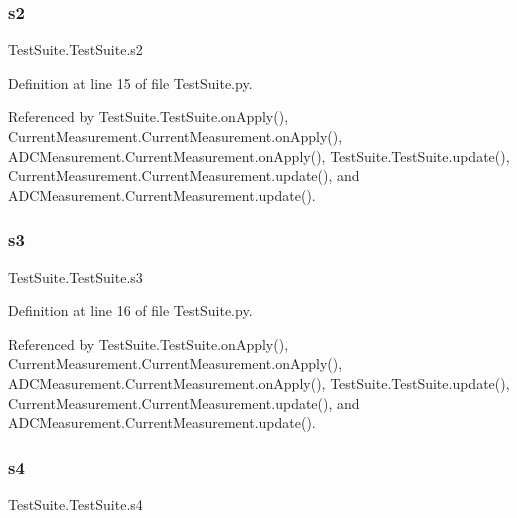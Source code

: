 \subsubsection{\texorpdfstring{s2}{s2}}
{\footnotesize\ttfamily Test\+Suite.\+Test\+Suite.\+s2}



Definition at line 15 of file Test\+Suite.\+py.



Referenced by Test\+Suite.\+Test\+Suite.\+on\+Apply(), Current\+Measurement.\+Current\+Measurement.\+on\+Apply(), A\+D\+C\+Measurement.\+Current\+Measurement.\+on\+Apply(), Test\+Suite.\+Test\+Suite.\+update(), Current\+Measurement.\+Current\+Measurement.\+update(), and A\+D\+C\+Measurement.\+Current\+Measurement.\+update().

\mbox{\label{classTestSuite_1_1TestSuite_a9995e2f1a3b89fdf26e782b9aefae2cc}} 
\subsubsection{\texorpdfstring{s3}{s3}}
{\footnotesize\ttfamily Test\+Suite.\+Test\+Suite.\+s3}



Definition at line 16 of file Test\+Suite.\+py.



Referenced by Test\+Suite.\+Test\+Suite.\+on\+Apply(), Current\+Measurement.\+Current\+Measurement.\+on\+Apply(), A\+D\+C\+Measurement.\+Current\+Measurement.\+on\+Apply(), Test\+Suite.\+Test\+Suite.\+update(), Current\+Measurement.\+Current\+Measurement.\+update(), and A\+D\+C\+Measurement.\+Current\+Measurement.\+update().

\mbox{\label{classTestSuite_1_1TestSuite_a8bd2aac24a75e71c7da35673d95f481a}} 
\subsubsection{\texorpdfstring{s4}{s4}}
{\footnotesize\ttfamily Test\+Suite.\+Test\+Suite.\+s4}



